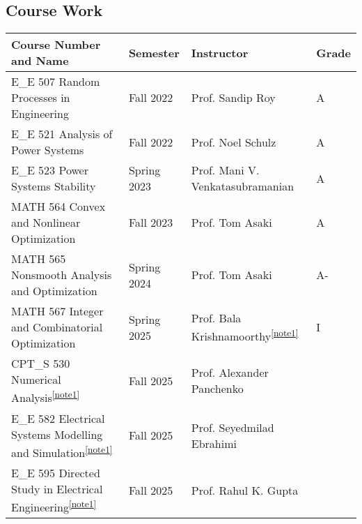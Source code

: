 \subsection{Course Work}
\begin{table}[h!]
\centering
\setlength{\tabcolsep}{4pt}
\label{tab:my-table}
\begin{adjustbox}{width=1\textwidth,center=\textwidth}
\begin{tabular}{@{}l|l|l|l@{}}
\toprule
Course Number and Name                          & Semester       & Instructor                     & Grade \\ \midrule

E\_E 507 Random Processes in Engineering        & Fall 2022      & Prof. Sandip Roy               & A    \\
E\_E 521 Analysis of Power Systems              & Fall 2022      & Prof. Noel Schulz              & A    \\
E\_E 523 Power Systems Stability                & Spring 2023    & Prof. Mani V. Venkatasubramanian & A   \\
MATH 564 Convex and Nonlinear Optimization      & Fall 2023      & Prof. Tom Asaki                & A    \\
MATH 565 Nonsmooth Analysis and Optimization    & Spring 2024    & Prof. Tom Asaki                & A-   \\
MATH 567 Integer and Combinatorial Optimization & Spring 2025    & Prof. Bala Krishnamoorthy\textsuperscript{\ref{note1}} & I \\
CPT\_S 530 Numerical Analysis\textsuperscript{\ref{note1}} & Fall 2025 & Prof. Alexander Panchenko & \\
E\_E 582 Electrical Systems Modelling and Simulation\textsuperscript{\ref{note1}} & Fall 2025 & Prof. Seyedmilad Ebrahimi & \\

E\_E 595 Directed Study in Electrical Engineering\textsuperscript{\ref{note1}} & Fall 2025 & Prof. Rahul K. Gupta & \\ \bottomrule
\end{tabular}
\end{adjustbox}


\end{table}


